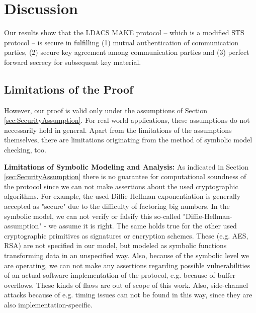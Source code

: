 \section{Discussion}
\label{Discussion}
Our results show that the LDACS MAKE protocol  -- which is a modified \ac{STS} protocol -- is secure in fulfilling (1) mutual authentication of communication parties, (2) secure key agreement among communication parties and (3) perfect forward secrecy for subsequent key material. 

\subsection{Limitations of the Proof}
However, our proof is valid only under the assumptions of Section \ref{sec:SecurityAssumption}. For real-world applications, these assumptions do not necessarily hold in general. Apart from the limitations of the assumptions themselves, there are limitations originating from the method of symbolic model checking, too. 

\textbf{Limitations of Symbolic Modeling and Analysis:}
\label{sec:LimitattionsofSymbolicModelChecking}
As indicated in Section \ref{sec:SecurityAssumption} there is no guarantee for computational soundness of the protocol since we can not make assertions about the used cryptographic algorithms. For example, the used Diffie-Hellman exponentiation is generally accepted as "secure" due to the difficulty of factoring big numbers. In the symbolic model, we can not verify or falsify this so-called "Diffie-Hellman-assumption" - we assume it is right. The same holds true for the other used cryptographic primitives as signatures or encryption schemes. These (e.g. AES, RSA) are not specified in our model, but modeled as symbolic functions transforming data in an unspecified way.
Also, because of the symbolic level we are operating, we can not make any assertions regarding possible vulnerabilities of an actual software implementation of the protocol, e.g. because of buffer overflows. These kinds of flaws are out of scope of this work. Also, side-channel attacks because of e.g. timing issues can not be found in this way, since they are also implementation-specific.

